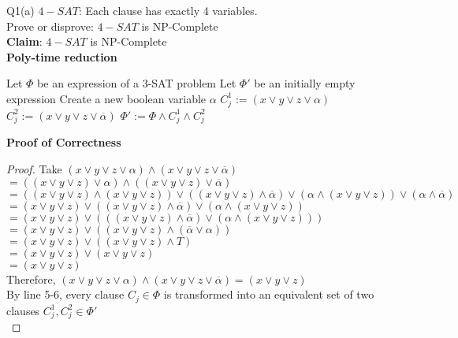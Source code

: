 \begin{problem}
    {Q1(a)}
    $4-SAT$: Each clause has exactly 4 variables. \\
    Prove or disprove: $4-SAT$ is NP-Complete \\
    \textbf{Claim}: $4-SAT$ is NP-Complete \\
    \textbf{Poly-time reduction}
    \begin{algorithmic}[1]
        \STATE Let $\Phi$ be an expression of a 3-SAT problem
        \STATE Let $\Phi'$ be an initially empty expression
            \STATE Create a new boolean variable $\alpha$
            \STATE $C^1_j := (x \lor y \lor z \lor \alpha)$
            \STATE $C^2_j := (x \lor y \lor z \lor \overline{\alpha})$
            $\Phi' := \Phi \land C^1_j \land C^2_j$ \\
        \ENDFOR
    \end{algorithmic}
    \noindent
    \textbf{Proof of Correctness}
    \begin{proof}
        Take $(x \lor y \lor z \lor \alpha) \land (x \lor y \lor z \lor \overline{\alpha})$ \\
        $ = ( (x \lor y \lor z) \lor \alpha) \land ( (x \lor y \lor z) \lor
        \overline{\alpha})$ \\
        $ = ((x \lor y \lor z) \land (x \lor y \lor z)) \lor ((x \lor y \lor z) \land \overline{\alpha}) \lor (\alpha \land (x \lor y \lor z)) \lor
        (\alpha \land \overline{\alpha})$ \\
        $ = (x \lor y \lor z) \lor ((x \lor y \lor z) \land \overline{\alpha}) \lor (\alpha \land (x \lor y \lor z))$ \\
        $ = (x \lor y \lor z) \lor \left(((x \lor y \lor z) \land \overline{\alpha}) \lor (\alpha \land (x \lor y \lor z))\right)$ \\
        $ = (x \lor y \lor z) \lor \left((x \lor y \lor z) \land (\overline{\alpha} \lor \alpha)\right)$ \\
        $ = (x \lor y \lor z) \lor ((x \lor y \lor z) \land T)$ \\
        $ = (x \lor y \lor z) \lor (x \lor y \lor z)$ \\
        $ = (x \lor y \lor z)$ \\
        Therefore, $(x \lor y \lor z \lor \alpha) \land (x \lor y \lor z \lor \overline{\alpha}) = (x \lor y \lor z)$ \\
        By line 5-6, every clause $C_j \in \Phi$ is transformed into an equivalent set of two clauses $C^1_j, C^2_j \in \Phi'$ \\

\end{proof}
\end{problem}
